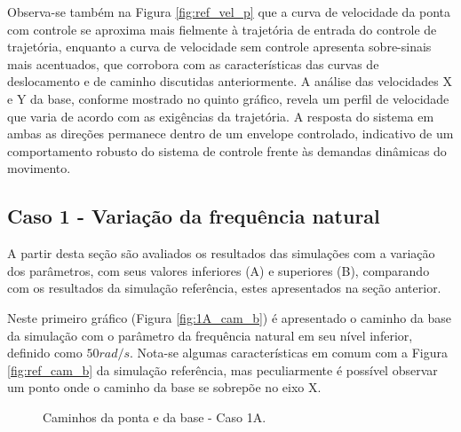 Observa-se também na Figura \ref{fig:ref_vel_p} que a curva de velocidade da ponta com controle se aproxima mais fielmente à trajetória de entrada do controle de trajetória, enquanto a curva de velocidade sem controle apresenta sobre-sinais mais acentuados, que corrobora com as características das curvas de deslocamento e de caminho discutidas anteriormente.
A análise das velocidades X e Y da base, conforme mostrado no quinto gráfico, revela um perfil de velocidade que varia de acordo com as exigências da trajetória. A resposta do sistema em ambas as direções permanece dentro de um envelope controlado, indicativo de um comportamento robusto do sistema de controle frente às demandas dinâmicas do movimento.

\subsection{Caso 1 - Variação da frequência natural}
A partir desta seção são avaliados os resultados das simulações com a variação dos parâmetros, com seus valores inferiores (A) e superiores (B), comparando com os resultados da simulação referência, estes apresentados na seção anterior.


Neste primeiro gráfico (Figura \ref{fig:1A_cam_b}) é apresentado o caminho da base da simulação com o parâmetro da frequência natural em seu nível inferior, definido como \(50 rad/s\). Nota-se algumas características em comum com a Figura \ref{fig:ref_cam_b} da simulação referência, mas peculiarmente é possível observar um ponto onde o caminho da base se sobrepõe no eixo X.

\begin{figure}[H]
    \centering
    \hfill
    \hfill
    \hfill
    \caption{Caminhos da ponta e da base - Caso 1A.}
    \label{fig:1A_cam}
\end{figure}

